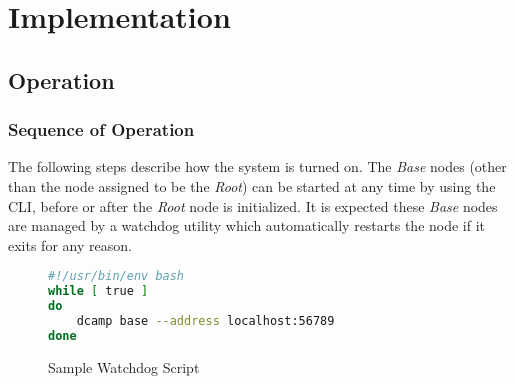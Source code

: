 \chapter{Implementation}
\label{implementation}

\section{\dcamp Operation}

\subsection{Sequence of \dcamp Operation}
\label{operation_sequnce}

The following steps describe how the \dcamp system is turned on. The \textit{Base} nodes (other than the node assigned
to be the \textit{Root}) can be started at any time by using the \dcamp CLI, before or after the \textit{Root} node is
initialized. It is expected these \textit{Base} nodes are managed by a watchdog utility which automatically restarts the
node if it exits for any reason.

\begin{figure}[H]
\vspace{+10pt}
\begin{lstlisting}[language=bash,frame=single,basicstyle=\footnotesize\ttfamily]
#!/usr/bin/env bash
while [ true ]
do
    dcamp base --address localhost:56789
done
\end{lstlisting}
\vspace{-10pt}
\caption{Sample Watchdog Script}
\label{fig:sample_watchdog}
\end{figure}

